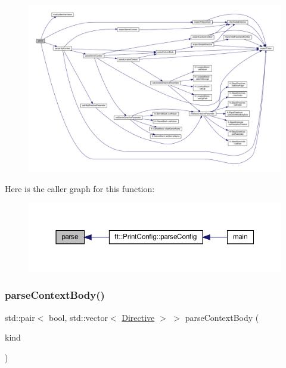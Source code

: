 \begin{figure}[H]
\begin{center}
\leavevmode
\includegraphics[width=350pt]{classft_1_1_parser_ace9c91f641d6eb5467ce89798679b248_cgraph}
\end{center}
\end{figure}
Here is the caller graph for this function\+:
\nopagebreak
\begin{figure}[H]
\begin{center}
\leavevmode
\includegraphics[width=350pt]{classft_1_1_parser_ace9c91f641d6eb5467ce89798679b248_icgraph}
\end{center}
\end{figure}
\mbox{\label{classft_1_1_parser_a2d0fd9222eca5d8ea7e8fbb79f0a30be}} 
\subsubsection{\texorpdfstring{parse\+Context\+Body()}{parseContextBody()}}
{\footnotesize\ttfamily std\+::pair$<$ bool, std\+::vector$<$ \hyperlink{classft_1_1_directive}{Directive} $>$ $>$ parse\+Context\+Body (\begin{DoxyParamCaption}\item[{enum \hyperlink{namespaceft_a5a5554dff10f0dc50bae4cc5825ad75d}{Directive\+Kind}}]{kind }\end{DoxyParamCaption})\hspace{0.3cm}{\ttfamily [private]}}



